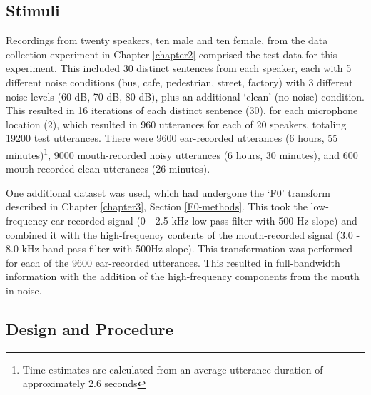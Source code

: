 \subsection{Stimuli}
\label{chap4:methods:stimuli}

Recordings from twenty speakers, ten male and ten female, from the data collection experiment in Chapter \ref{chapter2} comprised the test data for this experiment.  This included 30 distinct sentences from each speaker, each with 5 different noise conditions (bus, cafe, pedestrian, street, factory) with 3 different noise levels (60 dB, 70 dB, 80 dB), plus an additional `clean' (no noise) condition.  This resulted in 16 iterations of each distinct sentence (30), for each microphone location (2), which resulted in 960 utterances for each of 20 speakers, totaling 19200 test utterances.  There were 9600 ear-recorded utterances (6 hours, 55 minutes)\footnote{Time estimates are calculated from an average utterance duration of approximately 2.6 seconds}, 9000 mouth-recorded noisy utterances (6 hours, 30 minutes), and 600 mouth-recorded clean utterances (26 minutes).

One additional dataset was used, which had undergone the `F0' transform described in Chapter \ref{chapter3}, Section \ref{F0-methods}.  This took the low-frequency ear-recorded signal (0 - 2.5 kHz low-pass filter with 500 Hz slope) and combined it with the high-frequency contents of the mouth-recorded signal (3.0 - 8.0 kHz band-pass filter with 500Hz slope).  This transformation was performed for each of the 9600 ear-recorded utterances.  This resulted in full-bandwidth information with the addition of the high-frequency components from the mouth in noise.

\subsection{Design and Procedure}
\label{chap4:methods:design}

